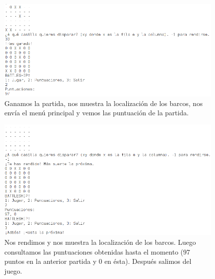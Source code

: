 \documentclass{article}
\begin{document}
\begin{figure}[H]
  \centering
  \includegraphics[width = 161mm]{imagenes/final}
  \caption{Ganamos la partida, nos muestra la localización de los barcos, nos envía el menú principal y vemos las puntuación de la partida.}
\end{figure}

\begin{figure}[H]
  \centering
  \includegraphics[width = 161mm]{imagenes/rendicion}
  \caption{Nos rendimos y nos muestra la localización de los barcos. Luego consultamos las puntuaciones obtenidas hasta el momento (97 puntos en la anterior partida y 0 en ésta). Después salimos del juego.}
\end{figure}
\end{document}
